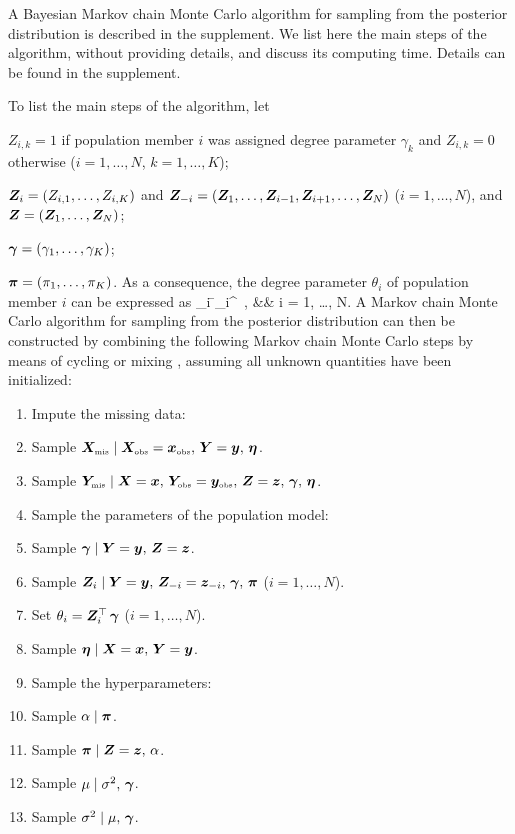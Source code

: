 A Bayesian Markov chain Monte Carlo algorithm for sampling from the posterior distribution is described in the supplement.
We list here the main steps of the algorithm,
without providing details,
and discuss its computing time.
Details can be found in the supplement.

To list the main steps of the algorithm,
let
\bi
\item $Z_{i,k} = 1$ if population member $i$ was assigned degree parameter $\gamma_k$ and $Z_{i,k}= 0$ otherwise ($i = 1, \dots, N$,\; $k = 1, \dots, K$);
\item $\bm{Z}_i = (Z_{i,1}, \dots, Z_{i,K})$ and $\bm{Z}_{-i} = (\bm{Z}_1, \dots, \bm{Z}_{i-1}, \bm{Z}_{i+1}, \dots, \bm{Z}_N)$ ($i = 1, \dots, N$),
and $\bm{Z} = (\bm{Z}_1, \dots, \bm{Z}_N)$;
\item $\mbox{\boldmath$\gamma$} = (\gamma_1, \dots, \gamma_K)$;
\item $\mbox{\boldmath$\pi$} = (\pi_1, \dots, \pi_K)$.
\ei
As a consequence,
the degree parameter $\theta_i$ of population member $i$ can be expressed as 
\bea
\nonumber
\theta_i 
\= \bZ_i^\top\, \bgamma,
&& i = 1, \dots, N.
\eea
A Markov chain Monte Carlo algorithm for sampling from the posterior distribution can then be constructed by combining the following Markov chain Monte Carlo steps by means of cycling or mixing \citep*{Tl94,Li08},
assuming all unknown quantities have been initialized:
\begin{enumerate}
\item Impute the missing data:
\bi
\item Sample $\bm{X}_{\mbox{\tiny mis}} \mid \bm{X}_{\mbox{\tiny obs}} = \bm{x}_{\mbox{\tiny obs}},\, \bm{Y} = \bm{y},\, \boldsymbol{\eta}$.
\item Sample $\bm{Y}_{\mbox{\tiny mis}} \mid \bm{X}=\bm{x},\, \bm{Y}_{\mbox{\tiny obs}} = \bm{y}_{\mbox{\tiny obs}},\, \bm{Z}=\bm{z},\, \mbox{\boldmath$\gamma$},\, \boldsymbol{\eta}$.
\ei
\item Sample the parameters of the population model:
\bi
\item Sample $\mbox{\boldmath$\gamma$} \mid \bm{Y}=\bm{y},\, \bm{Z}=\bm{z}$.
\item Sample $\bm{Z}_i \mid \bm{Y}=\bm{y},\, \bm{Z}_{-i} = \bm{z}_{-i},\, \mbox{\boldmath$\gamma$},\, \mbox{\boldmath$\pi$}$ ($i = 1, \dots, N$).
\item Set $\theta_i = \bm{Z}_i^\top\, \mbox{\boldmath$\gamma$}$ ($i = 1, \dots, N$).
\item Sample $\boldsymbol{\eta} \mid \bm{X} = \bm{x},\, \bm{Y} = \bm{y}$.
\ei
\item Sample the hyperparameters:
\bi
\item Sample $\alpha \mid \mbox{\boldmath$\pi$}$.
\item Sample $\mbox{\boldmath$\pi$} \mid \bm{Z}=\bm{z},\, \alpha$.
\item Sample $\mu \mid \sigma^2,\, \mbox{\boldmath$\gamma$}$.
\item Sample $\sigma^{2} \mid \mu,\, \mbox{\boldmath$\gamma$}$.
\ei
\end{enumerate}
